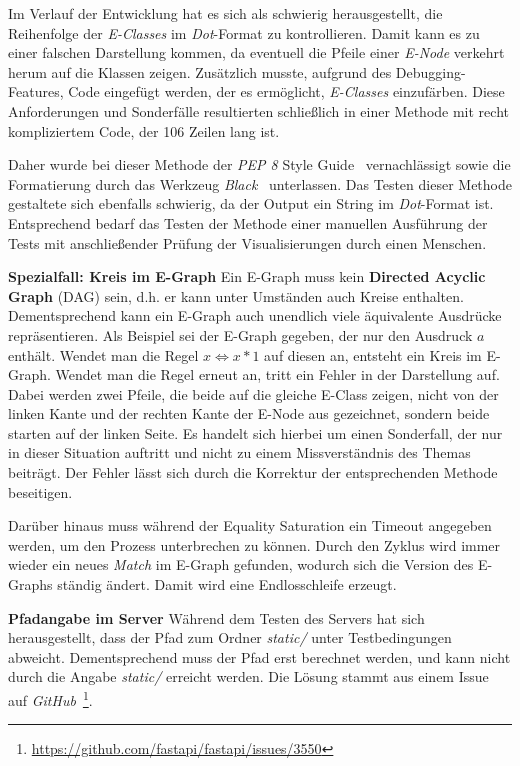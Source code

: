 Im Verlauf der Entwicklung hat es sich als schwierig herausgestellt, die Reihenfolge der \textit{E-Classes} im \textit{Dot}-Format zu kontrollieren.
Damit kann es zu einer falschen Darstellung kommen, da eventuell die Pfeile einer \textit{E-Node} verkehrt herum auf die Klassen zeigen.
Zusätzlich musste, aufgrund des Debugging-Features, Code eingefügt werden, der es ermöglicht, \textit{E-Classes} einzufärben.
Diese Anforderungen und Sonderfälle resultierten schließlich in einer Methode mit recht kompliziertem Code, der 106 Zeilen lang ist.

Daher wurde bei dieser Methode der \textit{PEP 8} Style Guide~\cite{pep} vernachlässigt sowie die Formatierung durch das Werkzeug \textit{Black}~\cite{black} unterlassen.
Das Testen dieser Methode gestaltete sich ebenfalls schwierig, da der Output ein String im \textit{Dot}-Format ist. Entsprechend bedarf das Testen der Methode
einer manuellen Ausführung der Tests mit anschließender Prüfung der Visualisierungen durch einen Menschen.

\noindent\textbf{Spezialfall: Kreis im E-Graph} Ein E-Graph muss kein \textbf{Directed Acyclic Graph} (DAG) sein, d.h. er kann unter Umständen auch Kreise enthalten. 
Dementsprechend kann ein E-Graph auch unendlich viele äquivalente Ausdrücke repräsentieren.
Als Beispiel sei der E-Graph gegeben, der nur den Ausdruck $a$ enthält. Wendet man die Regel $x \Leftrightarrow x * 1$ auf diesen an, entsteht ein Kreis im E-Graph.
Wendet man die Regel erneut an, tritt ein Fehler in der Darstellung auf. Dabei werden zwei Pfeile, die beide auf die gleiche E-Class zeigen, nicht von der linken Kante und der rechten
Kante der E-Node aus gezeichnet, sondern beide starten auf der linken Seite. Es handelt sich hierbei um einen Sonderfall, der nur in dieser Situation auftritt und nicht zu einem 
Missverständnis des Themas beiträgt. Der Fehler lässt sich durch die Korrektur der entsprechenden Methode beseitigen.

Darüber hinaus muss während der Equality Saturation ein Timeout angegeben werden, um den Prozess unterbrechen zu können. Durch den Zyklus wird immer wieder ein neues \textit{Match}
im E-Graph gefunden, wodurch sich die Version des E-Graphs ständig ändert. Damit wird eine Endlosschleife erzeugt.

\noindent\textbf{Pfadangabe im Server} Während dem Testen des Servers hat sich herausgestellt, dass der Pfad zum Ordner \textit{static/} unter Testbedingungen abweicht.
Dementsprechend muss der Pfad erst berechnet werden, und kann nicht durch die Angabe \textit{static/} erreicht werden. Die Lösung stammt aus einem Issue auf 
\textit{GitHub}~\footnote{\hspace{1.5mm}\url{https://github.com/fastapi/fastapi/issues/3550}}.

